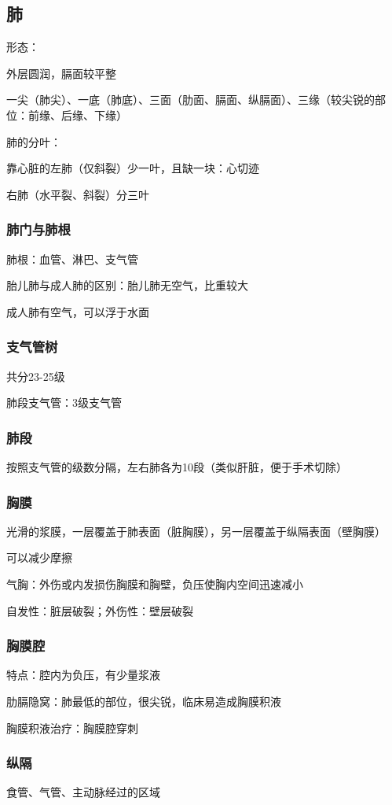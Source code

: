 \subsection{肺}%
\label{sub:肺}
形态：

外层圆润，膈面较平整
\begin{notation}
    一尖（肺尖）、一底（肺底）、三面（肋面、膈面、纵膈面）、三缘（较尖锐的部位：前缘、后缘、下缘）
\end{notation}
\begin{notation}
    肺的分叶：

    靠心脏的左肺（仅斜裂）少一叶，且缺一块：心切迹

    右肺（水平裂、斜裂）分三叶
\end{notation}
\subsubsection*{肺门与肺根}%
\label{subsub:肺门与肺根}
肺根：血管、淋巴、支气管
\begin{notation}
    胎儿肺与成人肺的区别：胎儿肺无空气，比重较大

    成人肺有空气，可以浮于水面
\end{notation}
\subsubsection*{支气管树}%
\label{subsub:支气管树}
共分23-25级

肺段支气管：3级支气管
\subsubsection*{肺段}%
\label{subsub:肺段}
按照支气管的级数分隔，左右肺各为10段（类似肝脏，便于手术切除）
\subsubsection*{胸膜}%
\label{subsub:胸膜}
光滑的浆膜，一层覆盖于肺表面（脏胸膜），另一层覆盖于纵隔表面（壁胸膜）

可以减少摩擦
\begin{notation}
    气胸：外伤或内发损伤胸膜和胸壁，负压使胸内空间迅速减小

    自发性：脏层破裂；外伤性：壁层破裂
\end{notation}
\subsubsection*{胸膜腔}%
\label{subsub:胸膜腔}
特点：腔内为负压，有少量浆液
\begin{notation}
    肋膈隐窝：肺最低的部位，很尖锐，临床易造成胸膜积液

    胸膜积液治疗：胸膜腔穿刺
\end{notation}
\subsubsection*{纵隔}%
\label{subsub:纵隔}
食管、气管、主动脉经过的区域
